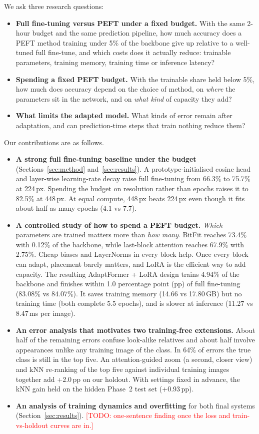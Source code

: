 \documentclass{article} %
\newcommand{\todo}[1]{\textcolor{red}{[TODO: #1]}}
\begin{document}
We ask three research questions:
\begin{itemize}
  \item[\textbf{RQ1}] \textbf{Full fine-tuning versus PEFT under a fixed budget.} With the
  same 2-hour budget and the same prediction pipeline, how much accuracy does a PEFT
  method training under 5\% of the backbone give up relative to a well-tuned full
  fine-tune, and which costs does it actually reduce: trainable parameters, training
  memory, training time or inference latency?
  \item[\textbf{RQ2}] \textbf{Spending a fixed PEFT budget.} With the trainable share held
  below 5\%, how much does accuracy depend on the choice of method, on \emph{where} the
  parameters sit in the network, and on \emph{what kind} of capacity they add?
  \item[\textbf{RQ3}] \textbf{What limits the adapted model.} What kinds of error remain
  after adaptation, and can prediction-time steps that train nothing reduce them?
\end{itemize}

Our contributions are as follows.
\begin{itemize}
  \item \textbf{A strong full fine-tuning baseline under the budget}
  (Sections~\ref{sec:method} and~\ref{sec:results}). A prototype-initialised cosine head
  and layer-wise learning-rate decay raise full fine-tuning from 66.3\% to 75.7\% at
  224\,px. Spending the budget on resolution rather than epochs raises it to 82.5\% at
  448\,px. At equal compute, 448\,px beats 224\,px even though it fits about half as many
epochs (4.1 vs 7.7).
  \item \textbf{A controlled study of how to spend a PEFT budget.} \emph{Which} parameters
  are trained matters more than \emph{how many}. BitFit reaches 73.4\% with 0.12\% of the
  backbone, while last-block attention reaches 67.9\% with 2.75\%. Cheap biases and
  LayerNorms in every block help. Once every block can adapt, placement barely matters,
  and LoRA is the efficient way to add capacity. The resulting AdaptFormer + LoRA design
  trains 4.94\% of the backbone and finishes within 1.0 percentage point (pp) of full
  fine-tuning (83.08\% vs 84.07\%). It saves training memory (14.66 vs 17.80\,GB) but no
  training time (both complete 5.5 epochs), and is slower at inference (11.27 vs 8.47\,ms
  per image).
  \item \textbf{An error analysis that motivates two training-free extensions.} About half
  of the remaining errors confuse look-alike relatives and about half involve
  appearances unlike any training image of the class. In 64\% of errors the true class is
  still in the top five. An attention-guided zoom (a second, closer view) and kNN
  re-ranking of the top five against individual training images together add
  +2.0\,pp on our holdout. With settings fixed in advance, the kNN gain held on the
  hidden Phase~2 test set (+0.93\,pp).
  \item \textbf{An analysis of training dynamics and overfitting} for both final systems
  (Section~\ref{sec:results}). \todo{one-sentence finding once the loss and
  train-vs-holdout curves are in.}
\end{itemize}
\end{document}
